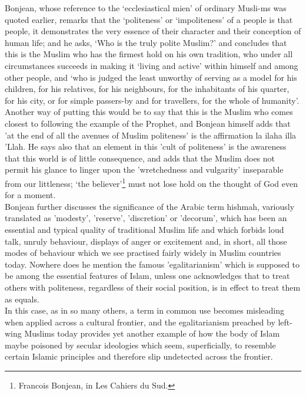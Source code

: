 \documentclass[10pt, twoside,openright]{book}
\begin{document}
Bonjean, whose reference to the `ecclesiastical mien' of ordinary Musli\hyp{}ms was quoted earlier, remarks 
that the `politeness' or `impoliteness' of a people is that people, it demonstrates the very essence 
of their character and their conception of human life; and he asks, `Who is the truly polite Muslim?' 
and concludes that this is the Muslim who has the firmest hold on his own tradition, who under all 
circumstances succeeds in making it `living and active' within himself and among other people, and 
`who is judged the least unworthy of serving as a model for his children, for his relatives, for his 
neighbours, for the inhabitants of his quarter, for his city, or for simple passers\hyp{}by and for 
travellers, for the whole of humanity'. Another way of putting this would be to say that this is the 
Muslim who comes closest to following the example of the Prophet, and Bonjean himself adds that 'at 
the end of all the avenues of Muslim politeness' is the affirmation la ilaha illa 'Llah. He says also 
that an element in this 'cult of politeness' is the awareness that this world is of little 
consequence, and adds that the Muslim does not permit his glance to linger upon the 'wretchedness and 
vulgarity' inseparable from our littleness; `the believer'\footnote{Francois Bonjean, in Les Cahiers du Sud.} must not lose hold on the thought of God even for a moment. \\

Bonjean further discusses the significance of the Arabic term hishmah, variously translated as 
'modesty', 'reserve', 'discretion' or 'decorum', which has been an essential and typical quality of 
traditional Muslim life and which forbids loud talk, unruly behaviour, displays of anger or 
excitement and, in short, all those modes of behaviour which we see practised fairly widely in Muslim 
countries today. Nowhere does he mention the famous 'egalitarianism' which is supposed to be among 
the essential features of Islam, unless one acknowledges that to treat others with politeness, 
regardless of their social position, is in effect to treat them as equals. \\

In this case, as in so many others, a term in common use becomes misleading when applied across a 
cultural frontier, and the egalitarianism preached by left\hyp{}wing Muslims today provides yet another 
example of how the body of Islam maybe poisoned by secular ideologies which seem, superficially, to 
resemble certain Islamic principles and therefore slip undetected across the frontier. \\
\end{document}
